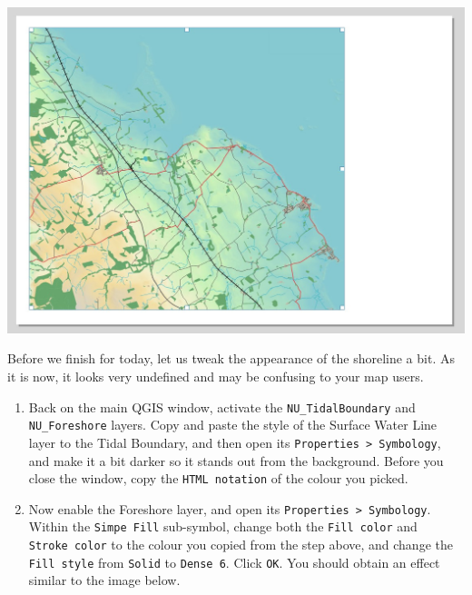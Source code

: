 \documentclass[
  letterpaper,
  DIV=11,
  numbers=noendperiod]{scrreprt}
\begin{document}
\includegraphics{images/lab_7/lab7_fig14_finalframe.jpg}

Before we finish for today, let us tweak the appearance of the shoreline
a bit. As it is now, it looks very undefined and may be confusing to
your map users.

\begin{enumerate}
\def\labelenumi{(\arabic{enumi})}
\setcounter{enumi}{217}
\item
  Back on the main QGIS window, activate the \texttt{NU\_TidalBoundary}
  and \texttt{NU\_Foreshore} layers. Copy and paste the style of the
  Surface Water Line layer to the Tidal Boundary, and then open its
  \texttt{Properties\ \textgreater{}\ Symbology}, and make it a bit
  darker so it stands out from the background. Before you close the
  window, copy the \texttt{HTML\ notation} of the colour you picked.
\item
  Now enable the Foreshore layer, and open its
  \texttt{Properties\ \textgreater{}\ Symbology}. Within the
  \texttt{Simpe\ Fill} sub-symbol, change both the \texttt{Fill\ color}
  and \texttt{Stroke\ color} to the colour you copied from the step
  above, and change the \texttt{Fill\ style} from \texttt{Solid} to
  \texttt{Dense\ 6}. Click \texttt{OK}. You should obtain an effect
  similar to the image below.
\end{enumerate}
\end{document}
